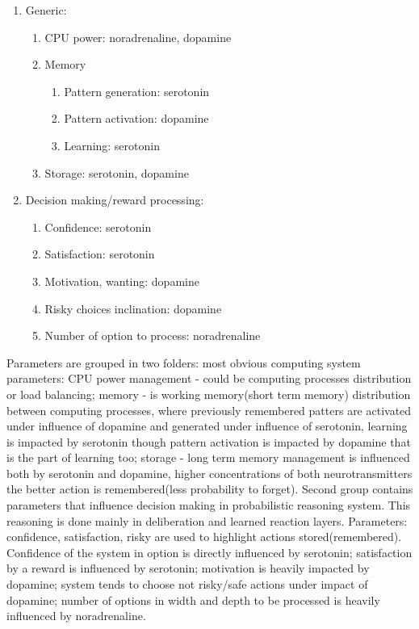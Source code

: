 \begin{enumerate}
\item  Generic:
\begin{enumerate}
\item  CPU power: noradrenaline, dopamine
\item  Memory
\begin{enumerate}
\item  Pattern generation: serotonin
\item  Pattern activation: dopamine
\item  Learning: serotonin
\end{enumerate}
\item  Storage: serotonin, dopamine
\end{enumerate}
\item  Decision making/reward processing:
\begin{enumerate}
\item  Confidence: serotonin
\item  Satisfaction: serotonin
\item  Motivation, wanting: dopamine
\item  Risky choices inclination: dopamine
\item  Number of option to process: noradrenaline
\end{enumerate}
\end{enumerate}

Parameters are grouped in two folders: most obvious computing system parameters: CPU power management - could be computing processes distribution or load balancing; memory - is working memory(short term memory) distribution between computing processes, where previously remembered patters are activated under influence of dopamine and generated under influence of serotonin, learning is impacted by serotonin though pattern activation is impacted by dopamine that is the part of learning too; storage - long term memory management is influenced both by serotonin and dopamine, higher concentrations of both neurotransmitters the better action is remembered(less probability to forget). Second group contains parameters that influence decision making in probabilistic reasoning system. This reasoning is done mainly in deliberation and learned reaction layers. Parameters: confidence, satisfaction, risky are used to highlight actions stored(remembered). Confidence of the system in option is directly influenced by serotonin; satisfaction by a reward is influenced by serotonin; motivation is heavily impacted by dopamine; system tends to choose not risky/safe actions under impact of dopamine; number of options in width and depth to be processed is heavily influenced by noradrenaline.

